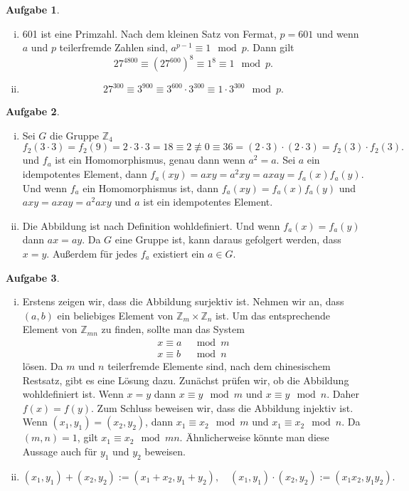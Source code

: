 \documentclass{article}
\theoremstyle{definition}
\newtheorem{ub}{Aufgabe}
\begin{document}
\begin{ub}
\begin{enumerate}[(i)]
	\item 
		601 ist eine Primzahl. Nach dem kleinen Satz von Fermat, $ p = 601 $ und wenn $ a $ und $ p $ teilerfremde Zahlen sind, $ a^{p-1} \equiv 1 \mod p $. Dann gilt
	\[ 
	27^{4800} \equiv \left( 27^{600} \right)^8 \equiv 1^8 \equiv 1  \mod p.
	\]
	\item
	\[ 
	27^{300} \equiv 3^{900} \equiv 3^{600} \cdot 3^{300} \equiv 1 \cdot 3^{300} \mod p.
	 \]
	
\end{enumerate}
\end{ub}
\begin{ub}
	\begin{enumerate}[(i)]
		\item 
		Sei $ G $ die Gruppe $ \mathbb{Z}_4 $
		\[ 
		f_2(3 \cdot 3) = f_2(9) = 2 \cdot 3 \cdot 3 = 18 \equiv 2 \not\equiv 
		0 \equiv 36 = (2 \cdot 3)\cdot (2 \cdot 3) = f_2(3) \cdot f_2(3).
		 \]
		und $ f_a $ ist ein Homomorphismus, genau dann wenn $ a^2 = a $. Sei $ a $ ein idempotentes Element, dann $ f_a(xy) = axy = a^2xy = axay = f_a(x)f_a(y) $. Und wenn $ f_a $ ein Homomorphismus ist, dann $ f_a(xy) = f_a(x)f_a(y) $ und $ axy = axay = a^2axy $ und $ a $ ist ein idempotentes Element.  
		\item 
		Die Abbildung ist nach Definition wohldefiniert. Und wenn $ f_a(x) = f_a(y) $ dann $ ax = ay $. Da $ G $ eine Gruppe ist, kann daraus gefolgert werden, dass $ x = y $. Au\ss erdem f\"ur jedes 
		$ f_a $ existiert ein $ a \in G $. 
	\end{enumerate}
\end{ub}
\begin{ub}
	\begin{enumerate}[(i)]
		\item 
		Erstens zeigen wir, dass die Abbildung surjektiv ist. Nehmen wir an, dass $ (a,b) $ ein beliebiges Element von $ \mathbb{Z}_m \times \mathbb{Z}_n $ ist. Um das entsprechende Element von $ \mathbb{Z} _{mn}$
		zu finden, sollte man das System 
		\[ 
		\begin{array}{ll}
			x \equiv a & \mod m \\
			x \equiv b & \mod n
		\end{array}
		\]
		l\"osen. Da $ m $ und $ n $ teilerfremde Elemente sind, nach dem chinesischem Restsatz, gibt es eine 
		L\"osung dazu. Zun\"achst pr\"ufen wir, ob die Abbildung wohldefiniert ist. Wenn $ x = y $ dann 
		$ x \equiv y \mod m $ und $ x \equiv y \mod n $. Daher $ f(x) = f(y) $. Zum Schluss beweisen wir, dass die Abbildung injektiv ist. Wenn $ (x_1, y_1) = (x_2 , y_2) $, dann 
		$ x_1 \equiv x_2 \mod m  $ und $ x_1 \equiv x_2 \mod n $. Da $ (m,n) = 1 $, gilt
		$ x_1 \equiv x_2 \mod mn $. \"Ahnlicherweise k\"onnte man diese Aussage auch f\"ur $ y_1 $ und $ y_2 $ beweisen. 
		\item 
		\[ 
		(x_1,y_1) + (x_2,y_2) := (x_1 + x_2 , y_1 + y_2), \quad 
		(x_1,y_1) \cdot (x_2,y_2) := (x_1x_2,y_1y_2).  
		 \]
	\end{enumerate}
\end{ub}
\end{document}
